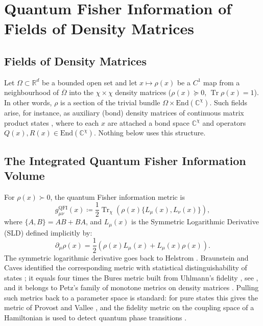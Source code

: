 \documentclass[11pt,a4paper,reqno]{amsart}
\theoremstyle{definition}
\numberwithin{equation}{section}
\newcommand{\R}{\mathbb{R}}
\newcommand{\C}{\mathbb{C}}
\newcommand{\Tr}{\operatorname{Tr}}
\begin{document}
\section{Quantum Fisher Information of Fields of Density Matrices}
\label{sec:quantum_info}

\subsection{Fields of Density Matrices}
Let $\Omega \subset \R^d$ be a bounded open set and let $x \mapsto \rho(x)$ be a $C^1$ map from a neighbourhood of $\overline{\Omega}$ into the $\chi \times \chi$ density matrices ($\rho(x) \succeq 0$, $\Tr\rho(x) = 1$). In other words, $\rho$ is a section of the trivial bundle $\Omega \times \mathrm{End}(\C^\chi)$. Such fields arise, for instance, as auxiliary (bond) density matrices of continuous matrix product states \cite{verstraete2010continuous}, where to each $x$ are attached a bond space $\C^\chi$ and operators $Q(x), R(x) \in \mathrm{End}(\C^\chi)$. Nothing below uses this structure.

\subsection{The Integrated Quantum Fisher Information Volume}
For $\rho(x) \succ 0$, the quantum Fisher information metric is
\begin{equation}
    g^{\mathrm{QFI}}_{\mu\nu}(x) \coloneqq \frac{1}{2} \Tr_\chi \left( \rho(x) \{ L_\mu(x), L_\nu(x) \} \right),
\end{equation}
where $\{A, B\} = AB + BA$, and $L_\mu(x)$ is the Symmetric Logarithmic Derivative (SLD) defined implicitly by:
\begin{equation}
    \partial_\mu \rho(x) = \frac{1}{2} \left( \rho(x) L_\mu(x) + L_\mu(x) \rho(x) \right).
    \label{eq:sld_implicit}
\end{equation}
The symmetric logarithmic derivative goes back to Helstrom \cite{helstrom1967minimum}. Braunstein and Caves identified the corresponding metric with statistical distinguishability of states \cite{braunstein1994statistical}; it equals four times the Bures metric built from Uhlmann's fidelity \cite{uhlmann1976transition}, see \cite[Sect.~2.4.2]{liu2020quantum}, and it belongs to Petz's family of monotone metrics on density matrices \cite{petz1996monotone}. Pulling such metrics back to a parameter space is standard: for pure states this gives the metric of Provost and Vallee \cite{provost1980riemannian}, and the fidelity metric on the coupling space of a Hamiltonian is used to detect quantum phase transitions \cite{zanardi2007information}.
\end{document}
